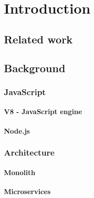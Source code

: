 \chapter{Introduction\label{intro}}


\section{Related work}

\section{Background}

\subsection{JavaScript}

\subsubsection{V8 - JavaScript engine}

\subsubsection{Node.js}

\subsection{Architecture}

\subsubsection{Monolith}

\subsubsection{Microservices}
